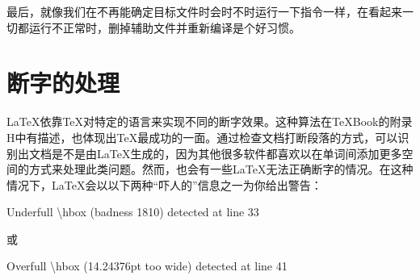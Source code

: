 最后，就像我们在不再能确定目标文件时会时不时运行一下指令一样，在看起来一切都运行不正常时，删掉辅助文件并重新编译是个好习惯。

\section{断字的处理}

\LaTeX 依靠\TeX 对特定的语言来实现不同的断字效果。这种算法在\TeX Book的附录H中有描述，也体现出\TeX 最成功的一面。通过检查文档打断段落的方式，可以识别出文档是不是由\LaTeX 生成的，因为其他很多软件都喜欢以在单词间添加更多空间的方式来处理此类问题。然而，也会有一些\LaTeX 无法正确断字的情况。在这种情况下，\LaTeX 会以以下两种“吓人的”信息之一为你给出警告：

\begin{dmd}
Underfull \backslash hbox (badness 1810) detected at line 33
\end{dmd}

或

\begin{dmd}
Overfull \backslash hbox (14.24376pt too wide) detected at line 41
\end{dmd}